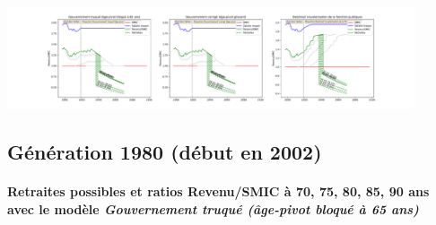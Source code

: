  \begin{center}\includegraphics[width=0.9\textwidth]{fig/BIATSS_1975_22_dest_retraite.pdf}\end{center} \label{fig/BIATSS_1975_22_dest_retraite.pdf} 

\newpage 
 
\subsection{Génération 1980 (début en 2002)} 

\paragraph{Retraites possibles et ratios Revenu/SMIC à 70, 75, 80, 85, 90 ans avec le modèle \emph{Gouvernement truqué (âge-pivot bloqué à 65 ans)}}  
 
